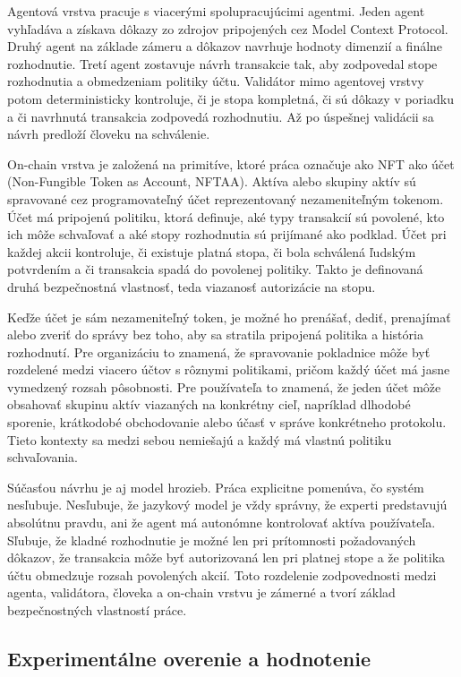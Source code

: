 Agentová vrstva pracuje s viacerými spolupracujúcimi agentmi. Jeden agent vyhľadáva a získava dôkazy zo zdrojov pripojených cez Model Context Protocol. Druhý agent na základe zámeru a dôkazov navrhuje hodnoty dimenzií a finálne rozhodnutie. Tretí agent zostavuje návrh transakcie tak, aby zodpovedal stope rozhodnutia a obmedzeniam politiky účtu. Validátor mimo agentovej vrstvy potom deterministicky kontroluje, či je stopa kompletná, či sú dôkazy v poriadku a či navrhnutá transakcia zodpovedá rozhodnutiu. Až po úspešnej validácii sa návrh predloží človeku na schválenie.

On-chain vrstva je založená na primitíve, ktoré práca označuje ako NFT ako účet (Non-Fungible Token as Account, NFTAA). Aktíva alebo skupiny aktív sú spravované cez programovateľný účet reprezentovaný nezameniteľným tokenom. Účet má pripojenú politiku, ktorá definuje, aké typy transakcií sú povolené, kto ich môže schvaľovať a aké stopy rozhodnutia sú prijímané ako podklad. Účet pri každej akcii kontroluje, či existuje platná stopa, či bola schválená ľudským potvrdením a či transakcia spadá do povolenej politiky. Takto je definovaná druhá bezpečnostná vlastnosť, teda viazanosť autorizácie na stopu.

Keďže účet je sám nezameniteľný token, je možné ho prenášať, dediť, prenajímať alebo zveriť do správy bez toho, aby sa stratila pripojená politika a história rozhodnutí. Pre organizáciu to znamená, že spravovanie pokladnice môže byť rozdelené medzi viacero účtov s rôznymi politikami, pričom každý účet má jasne vymedzený rozsah pôsobnosti. Pre používateľa to znamená, že jeden účet môže obsahovať skupinu aktív viazaných na konkrétny cieľ, napríklad dlhodobé sporenie, krátkodobé obchodovanie alebo účasť v správe konkrétneho protokolu. Tieto kontexty sa medzi sebou nemiešajú a každý má vlastnú politiku schvaľovania.

Súčasťou návrhu je aj model hrozieb. Práca explicitne pomenúva, čo systém nesľubuje. Nesľubuje, že jazykový model je vždy správny, že experti predstavujú absolútnu pravdu, ani že agent má autonómne kontrolovať aktíva používateľa. Sľubuje, že kladné rozhodnutie je možné len pri prítomnosti požadovaných dôkazov, že transakcia môže byť autorizovaná len pri platnej stope a že politika účtu obmedzuje rozsah povolených akcií. Toto rozdelenie zodpovednosti medzi agenta, validátora, človeka a on-chain vrstvu je zámerné a tvorí základ bezpečnostných vlastností práce.

\subsection{Experimentálne overenie a hodnotenie}

